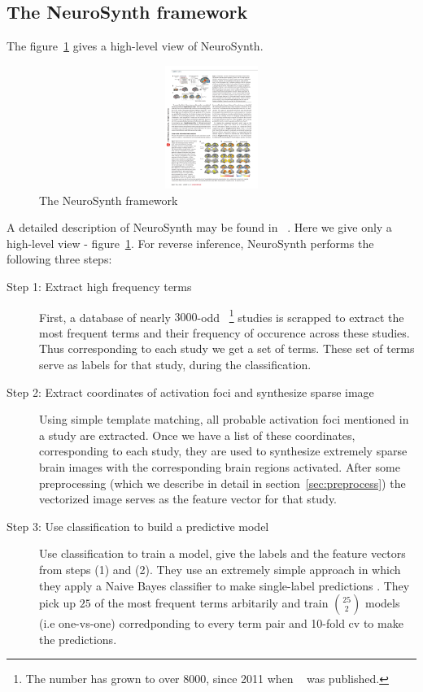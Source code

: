 \documentclass{article} %
\begin{document}
\subsection{The NeuroSynth framework}
The figure~\ref{fig:3steps} gives a high-level view of  NeuroSynth. 

\begin{figure}[h]
\begin{center}
\includegraphics[height=4cm, width=14cm]{3steps.pdf}
\end{center}
\caption{The NeuroSynth framework~\cite{yarkoni2011large}}
\label{fig:3steps}
\end{figure}

A detailed description of NeuroSynth may be found in ~\cite{yarkoni2011large}. Here we give only a high-level view  - figure~\ref{fig:3steps}.  For reverse inference, NeuroSynth performs the following three steps:
\begin{description}
\item[Step 1:  Extract high frequency terms] First, a database of nearly $3000$-odd ~\footnote{The number has grown to over $8000$, since 2011 when ~\cite{yarkoni2011large} was published.} studies is scrapped to extract the most frequent terms and their frequency of occurence across these studies. Thus corresponding to each study we get a set of terms. These set of terms serve as labels for that study, during the classification.
\item[Step 2: Extract coordinates of activation foci and synthesize sparse image] Using simple template matching, all probable activation foci mentioned in a study are extracted. Once we have a list of these coordinates, corresponding to each study, they are used to synthesize extremely sparse brain images with the corresponding brain regions activated. After some preprocessing (which we describe in detail in section~\ref{sec:preprocess}) the vectorized image serves as the feature vector for that study.
\item[Step 3: Use classification to build a predictive model]  Use classification to train a model, give the labels and the feature vectors from steps (1) and (2). They use an extremely simple approach in which they apply a Naive Bayes classifier to make single-label predictions . They pick up $25$ of the most frequent terms arbitarily and train $25 \choose 2$ models (i.e one-vs-one) corredponding to every term pair and 10-fold cv to make the predictions.
\end{description}
\end{document}
